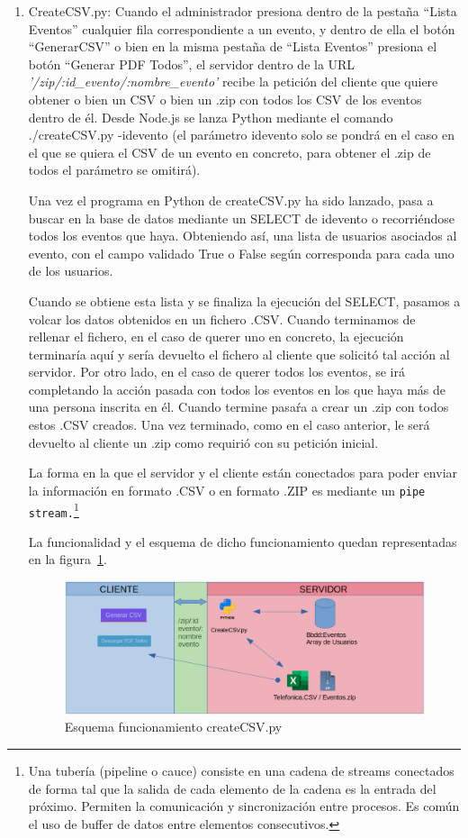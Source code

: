 \documentclass[a4paper, 12pt]{book}
\begin{document}
\begin{enumerate}
  	\item CreateCSV.py: Cuando el administrador presiona dentro de la pestaña ``Lista Eventos'' cualquier fila correspondiente a un evento, y dentro de ella el botón ``GenerarCSV'' o bien en la misma pestaña de ``Lista Eventos'' presiona el botón ``Generar PDF Todos'', el servidor dentro de la URL \textit{'/zip/:id\_evento/:nombre\_evento'} recibe la petición del cliente que quiere obtener o bien un CSV o bien un .zip con todos los CSV de los eventos dentro de él. Desde Node.js se lanza Python mediante el comando ./createCSV.py -idevento (el parámetro idevento solo se pondrá en el caso en el que se quiera el CSV de un evento en concreto, para obtener el .zip de todos el parámetro se omitirá).
  	
  	Una vez el programa en Python de createCSV.py ha sido lanzado, pasa a buscar en la base de datos mediante un SELECT de idevento o recorriéndose todos los eventos que haya. Obteniendo así, una lista de usuarios asociados al evento, con el campo validado True o False según corresponda para cada uno de los usuarios.
  	
  	Cuando se obtiene esta lista y se finaliza la ejecución del SELECT, pasamos a volcar los datos obtenidos en un fichero .CSV. Cuando terminamos de rellenar el fichero, en el caso de querer uno en concreto, la ejecución terminaría aquí y sería devuelto el fichero al cliente que solicitó tal acción al servidor. Por otro lado, en el caso de querer todos los eventos, se irá completando la acción pasada con todos los eventos en los que haya más de una persona inscrita en él. Cuando termine pasaŕa a crear un .zip con todos estos .CSV creados. Una vez terminado, como en el caso anterior, le será devuelto al cliente un .zip como requirió con su petición inicial.
  	
  	La forma en la que el servidor y el cliente están conectados para poder enviar la información en formato .CSV o en formato .ZIP es mediante un \texttt{pipe stream.}\footnote{Una tubería (pipeline o cauce) consiste en una cadena de streams conectados de forma tal que la salida de cada elemento de la cadena es la entrada del próximo. Permiten la comunicación y sincronización entre procesos. Es común el uso de buffer de datos entre elementos consecutivos.}
  	
  	La funcionalidad y el esquema de dicho funcionamiento quedan representadas en la figura~\ref{fig:createCSV}.

\begin{figure}[h!]
  \centering
  \includegraphics[width=16cm, keepaspectratio]{img/createCSV.png}
  	\caption{Esquema funcionamiento createCSV.py}\label{fig:createCSV}
\end{figure}  	
  	

\end{enumerate}
\end{document}
